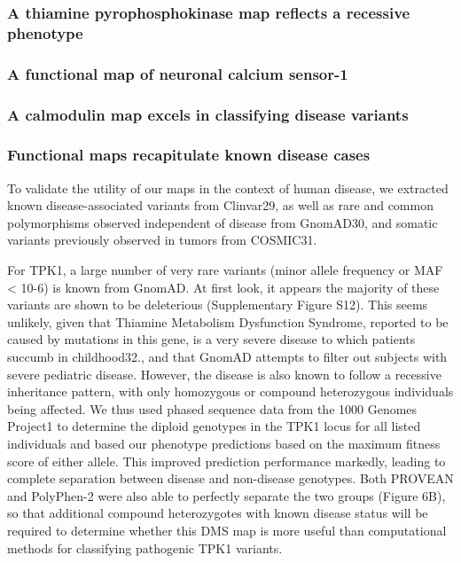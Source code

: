 \subsubsection{A thiamine pyrophosphokinase map reflects a recessive phenotype}

\subsubsection{A functional map of neuronal calcium sensor-1}

\subsubsection{A calmodulin map excels in classifying disease variants}

\subsubsection{Functional maps recapitulate known disease cases}

To validate the utility of our maps in the context of human disease, we extracted known disease-associated variants from Clinvar29, as well as rare and common polymorphisms observed independent of disease from GnomAD30, and somatic variants previously observed in tumors from COSMIC31. 

For TPK1, a large number of very rare variants (minor allele frequency or MAF < 10-6) is known from GnomAD. At first look, it appears the majority of these variants are shown to be deleterious (Supplementary Figure S12). This seems unlikely, given that Thiamine Metabolism Dysfunction Syndrome, reported to be caused by mutations in this gene, is a very severe disease to which patients succumb in childhood32., and that GnomAD attempts to filter out subjects with severe pediatric disease. However, the disease is also known to follow a recessive inheritance pattern, with only homozygous or compound heterozygous individuals being affected. We thus used phased sequence data from the 1000 Genomes Project1 to determine the diploid genotypes in the TPK1 locus for all listed individuals and based our phenotype predictions based on the maximum fitness score of either allele. This improved prediction performance markedly, leading to complete separation between disease and non-disease genotypes. Both PROVEAN and PolyPhen-2 were also able to perfectly separate the two groups (Figure 6B), so that additional compound heterozygotes with known disease status will be required to determine whether this DMS map is more useful than computational methods for classifying pathogenic TPK1 variants. 


